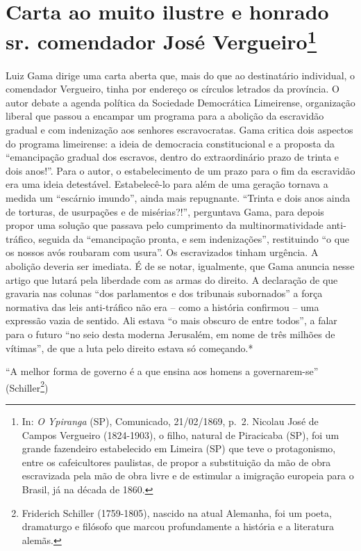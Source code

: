 \chapter{Carta ao muito ilustre e honrado sr. comendador José
Vergueiro\footnote{In: \emph{O Ypiranga} (SP), Comunicado, 21/02/1869,
  p.~2. Nicolau José de Campos Vergueiro (1824-1903), o filho, natural
  de Piracicaba (SP), foi um grande fazendeiro estabelecido em Limeira
  (SP) que teve o protagonismo, entre os cafeicultores paulistas, de
  propor a substituição da mão de obra escravizada pela mão de obra
  livre e de estimular a imigração europeia para o Brasil, já na década
  de 1860.}}

\begin{didascalia}
Luiz Gama dirige uma carta aberta que, mais do que ao destinatário
individual, o comendador Vergueiro, tinha por endereço os círculos
letrados da província. O autor debate a agenda política da Sociedade
Democrática Limeirense, organização liberal que passou a encampar um
programa para a abolição da escravidão gradual e com indenização aos
senhores escravocratas. Gama critica dois aspectos do programa
limeirense: a ideia de democracia constitucional e a proposta da
``emancipação gradual dos escravos, dentro do extraordinário prazo de
trinta e dois anos!''. Para o autor, o estabelecimento de um prazo para o
fim da escravidão era uma ideia detestável. Estabelecê-lo para além de
uma geração tornava a medida um ``escárnio imundo'', ainda mais
repugnante. ``Trinta e dois anos ainda de torturas, de usurpações e de
misérias?!'', perguntava Gama, para depois propor uma solução que passava
pelo cumprimento da multinormatividade anti-tráfico, seguida da
``emancipação pronta, e sem indenizações'', restituindo ``o que os nossos
avós roubaram com usura''. Os escravizados tinham urgência. A abolição
deveria ser imediata. É de se notar, igualmente, que Gama anuncia nesse
artigo que lutará pela liberdade com as armas do direito. A declaração
de que gravaria nas colunas ``dos parlamentos e dos tribunais subornados''
a força normativa das leis anti-tráfico não era -- como a história
confirmou -- uma expressão vazia de sentido. Ali estava ``o mais obscuro
de entre todos'', a falar para o futuro ``no seio desta moderna Jerusalém,
em nome de três milhões de vítimas'', de que a luta pelo direito estava
só começando.*
\end{didascalia}

\asterisc{}

``A melhor forma de governo é a que ensina aos homens a governarem-se''
(Schiller\footnote{Friderich Schiller (1759-1805), nascido na atual
  Alemanha, foi um poeta, dramaturgo e filósofo que marcou profundamente
  a história e a literatura alemãs.})

